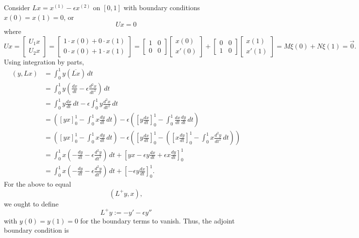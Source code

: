 \documentclass[11pt, oneside, a4paper]{article}
\begin{document}
Consider $Lx=x^{(1)} - \epsilon x^{(2)}$ on $[0,1]$ with boundary conditions $x(0)=x(1)=0$, or
\[Ux=0\]
where
\[Ux = 
\begin{bmatrix}
    U_1x\\
    U_2x
\end{bmatrix} =
\begin{bmatrix}
    1\cdot x(0) + 0\cdot x(1)\\
    0\cdot x(0) + 1\cdot x(1)
\end{bmatrix} =
\begin{bmatrix}
    1 & 0\\
    0 & 0
\end{bmatrix}
\begin{bmatrix}
    x(0)\\
    x'(0)
\end{bmatrix} +
\begin{bmatrix}
    0 & 0\\
    1 & 0
\end{bmatrix}
\begin{bmatrix}
    x(1)\\
    x'(1)
\end{bmatrix} =
M\xi(0) + N\xi(1)
= \vec{0}.\]
Using integration by parts,
\begin{align*}
    (y, Lx) &= \int_0^1 y (\overline{Lx})\,dt\\
    &= \int_0^1 y (\frac{dx}{dt} - \epsilon \frac{d^2 x}{dt^2})\,dt\\
    &= \int_0^1 y\frac{dx}{dt}\,dt - \epsilon\int_0^1 y\frac{d^2 x}{dt^2}\,dt\\
    &= \left(\left[yx\right]_0^1 - \int_0^1 x\frac{dy}{dt}\,dt\right) - \epsilon\left(\left[y\frac{dx}{dt}\right]_0^1 - \int_0^1 \frac{dx}{dt}\frac{dy}{dt}\,dt\right)\\
    &= \left(\left[yx\right]_0^1 - \int_0^1 x\frac{dy}{dt}\,dt\right) - \epsilon\left(\left[y\frac{dx}{dt}\right]_0^1 - \left(\left[x\frac{dy}{dt}\right]_0^1 - \int_0^1 x\frac{d^2 y}{dt^2}\,dt\right)\right)\\
    &= \int_0^1 x\left(-\frac{dy}{dt} - \epsilon\frac{d^2 y}{dt^2}\right)\,dt + \left[yx - \epsilon y\frac{dx}{dt} + \epsilon x\frac{dy}{dt}\right]_0^1\\
    &= \int_0^1 x\left(-\frac{dy}{dt} - \epsilon\frac{d^2 y}{dt^2}\right)\,dt + \left[-\epsilon y\frac{dx}{dt}\right]_0^1.
\end{align*}
For the above to equal
\[(L^+y, x),\]
we ought to define
\[
    L^+y := -y' - \epsilon y''  
\]
with $y(0)=y(1)=0$ for the boundary terms to vanish. Thus, the adjoint boundary condition is
\end{document}
